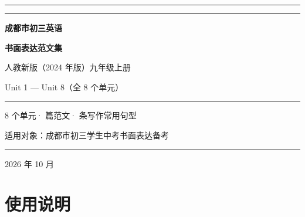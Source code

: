 \documentclass[UTF8,a4paper,11pt,oneside]{ctexbook}
\begin{document}
\linespread{1.32}\selectfont

\begin{titlepage}
  \thispagestyle{empty}
  \centering
  \vspace*{1.4cm}
  {\color{mainblue}\rule{\linewidth}{1.8pt}}\par
  \vspace{0.55cm}
  {\color{rulelight}\rule{\linewidth}{0.6pt}}\par
  \vspace{1.5cm}
  {\sffamily\bfseries\fontsize{36pt}{46pt}\selectfont\color{mainblue} 成都市初三英语\par}
  \vspace{0.35cm}
  {\sffamily\bfseries\fontsize{36pt}{46pt}\selectfont\color{mainblue} 书面表达范文集\par}
  \vspace{1.3cm}
  {\sffamily\fontsize{15pt}{21pt}\selectfont\color{accent} 人教新版（2024 年版）九年级上册\par}
  \vspace{0.3cm}
  {\sffamily\Large\color{mainblue} Unit 1 — Unit 8（全 8 个单元）\par}
  \vspace{1.0cm}
  {\color{accent}\rule{0.62\linewidth}{0.8pt}}\par
  \vspace{0.9cm}
  {\sffamily\large\color{textgray} 8 个单元\quad· 篇范文\quad· 条写作常用句型\par}
  \vfill
  {\large\sffamily 适用对象：成都市初三学生\quad 中考书面表达备考\par}
  \vspace{0.9cm}
  {\color{rulelight}\rule{0.62\linewidth}{0.6pt}}\par
  \vspace{0.5cm}
  {\sffamily\normalsize\color{textgray} 2026 年 10 月\par}
  \vspace*{0.6cm}
\end{titlepage}

\frontmatter
\pagestyle{plain}

\chapter*{使用说明}
{}
\end{document}
